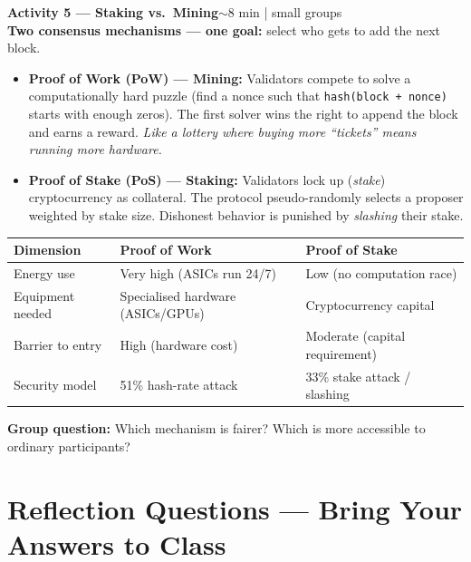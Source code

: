 \documentclass[11pt,a4paper]{article}
\newcommand{\activitybox}[3]{%
  \noindent\colorbox{mllavender4}{\parbox{\dimexpr\linewidth-2\fboxsep}{%
    \textbf{\color{mlpurple}#1}\hfill\textcolor{mlgray}{\small #2}\\[2pt]#3%
  }}\par\vspace{4pt}%
}
\begin{document}
\activitybox{Activity 5 — Staking vs.\ Mining}{$\sim$8 min | small groups}{%
\textbf{Two consensus mechanisms — one goal:} select who gets to add the next block.

\begin{itemize}
  \item \textbf{Proof of Work (PoW) — Mining:} Validators compete to solve a computationally hard puzzle (find a nonce such that \texttt{hash(block + nonce)} starts with enough zeros). The first solver wins the right to append the block and earns a reward. \textit{Like a lottery where buying more ``tickets'' means running more hardware.}
  \item \textbf{Proof of Stake (PoS) — Staking:} Validators lock up (\textit{stake}) cryptocurrency as collateral. The protocol pseudo-randomly selects a proposer weighted by stake size. Dishonest behavior is punished by \textit{slashing} their stake.
\end{itemize}

\vspace{3pt}
\begin{center}
\renewcommand{\arraystretch}{1.35}
\begin{tabular}{|l|p{4.2cm}|p{4.2cm}|}
\hline
\textbf{Dimension} & \textbf{Proof of Work} & \textbf{Proof of Stake} \\
\hline
Energy use & Very high (ASICs run 24/7) & Low (no computation race) \\
\hline
Equipment needed & Specialised hardware (ASICs/GPUs) & Cryptocurrency capital \\
\hline
Barrier to entry & High (hardware cost) & Moderate (capital requirement) \\
\hline
Security model & 51\% hash-rate attack & 33\% stake attack / slashing \\
\hline
\end{tabular}
\end{center}

\vspace{2pt}
\textbf{Group question:} Which mechanism is fairer? Which is more accessible to ordinary participants?
}

\vspace{4pt}

\section{Reflection Questions — Bring Your Answers to Class}
\end{document}
